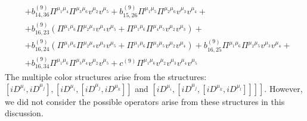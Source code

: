 \begin{align}
&+b_{14,36}^{(9)} \Pi^{\mu_{1} \mu_{4}} \Pi^{\mu_{3} \mu_{6}} v^{\mu_{2}} v^{\mu_{5}}+b_{15,26}^{(9)} \Pi^{\mu_{1} \mu_{5}} \Pi^{\mu_{2} \mu_{6}} v^{\mu_{3}} v^{\mu_{4}}+\nonumber\\
&+b_{16, 23}^{(9)}\left(\Pi^{\mu_{1} \mu_{6}} \Pi^{\mu_{2} \mu_{3}} v^{\mu_{4}} v^{\mu_{5}}+\Pi^{\mu_{1} \mu_{6}} \Pi^{\mu_{4} \mu_{5}} v^{\mu_{2}} v^{\mu_{3}}\right)+\nonumber\\
&+b_{16,24}^{(9)}\left(\Pi^{\mu_{1} \mu_{6}} \Pi^{\mu_{2} \mu_{4}} v^{\mu_{3}} v^{\mu_{5}}+\Pi^{\mu_{1} \mu_{6}} \Pi^{\mu_{3} \mu_{5}} v^{\mu_{2}} v^{\mu_{4}}\right)+b_{16,25}^{(9)} \Pi^{\mu_{1} \mu_{6}} \Pi^{\mu_{2} \mu_{5}} v^{\mu_{3}} v^{\mu_{4}}+\nonumber\\
&+b_{16,34}^{(9)} \Pi^{\mu_{1} \mu_{6}} \Pi^{\mu_{3} \mu_{4}} v^{\mu_{2}} v^{\mu_{5}}+c^{(9)} \Pi^{\mu_{1} \mu_{6}} v^{\mu_{2}} v^{\mu_{3}} v^{\mu_{4}} v^{\mu_{5}}
\end{align}
The multiple color structures arise from the structures: $\left[i D^{\mu_{i}}, i D^{\mu_{j}}\right],\left[i D^{\mu_{i}},\left[i D^{\mu_{j}}, i D^{\mu_{k}}\right]\right]$ and $\left.\left[i D^{\mu_{i}},\left[i D^{\mu_{j}},\left[i D^{\mu_{k}}, i D^{\mu_{l}}\right]\right]\right]\right]$. However, we did not consider the possible operators arise from these structures in this discussion. 

